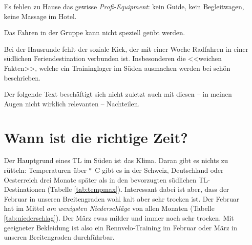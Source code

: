 \documentclass[a4paper,DIV13,BCOR0cm]{scrartcl}
\newcommand{\rv}{Rennvelo}
\begin{document}
Es fehlen zu Hause das gewisse \emph{Profi-Equipment}: kein Guide, kein Begleitwagen, keine Massage im Hotel.

Das Fahren in der Gruppe kann nicht speziell geübt werden.

Bei der Hausrunde fehlt der soziale Kick, der mit einer Woche Radfahren in einer südlichen Feriendestination verbunden ist.
Insbesonderen die <<weichen Fakten>>, welche ein Traininglager im Süden ausmachen werden bei 
schön beschrieben.

Der folgende Text beschäftigt sich nicht zuletzt auch mit diesen -- in meinen Augen nicht wirklich relevanten -- Nachteilen.

\section{Wann ist die richtige Zeit?}
\label{sec:richtigezeit}

Der Hauptgrund eines TL im Süden ist das Klima.
Daran gibt es nichts zu rütteln: Temperaturen über \unit[10]{\degree C} gibt es in der Schweiz, Deutschland oder Oesterreich
drei Monate später als in den bevorzugten südlichen TL-Destinationen (Tabelle \ref{tab:tempmax}).
Interessant dabei ist aber, dass der Februar in unseren Breitengraden
wohl kalt aber sehr trocken ist.
Der Februar hat im Mittel \textit{am wenigsten Niederschläge} von allen Monaten (Tabelle \ref{tab:niederschlag}).
Der März ewas milder und immer noch sehr trocken.
Mit geeigneter Bekleidung ist also ein \rv-Training im Februar oder März
in unseren Breitengraden durchführbar.
\end{document}
